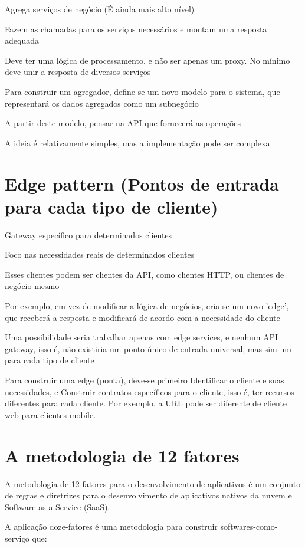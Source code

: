 Agrega serviços de negócio (É ainda mais alto nível)

Fazem as chamadas para os serviços necessários e montam uma resposta adequada

Deve ter uma lógica de processamento, e não ser apenas um proxy. No mínimo deve unir a resposta de diversos serviços

Para construir um agregador, define-se um novo modelo para o sistema, que representará os dados agregados como um subnegócio

A partir deste modelo, pensar na API que fornecerá as operações

A ideia é relativamente simples, mas a implementação pode ser complexa

\section{Edge pattern (Pontos de entrada para cada tipo de cliente)}
Gateway específico para determinados clientes

Foco nas necessidades reais de determinados clientes

Esses clientes podem ser clientes da API, como clientes HTTP, ou clientes de negócio mesmo

Por exemplo, em vez de modificar a lógica de negócios, cria-se um novo 'edge', que receberá a resposta e modificará de acordo com a necessidade do cliente

Uma possibilidade seria trabalhar apenas com edge services, e nenhum API gateway, isso é, não existiria um ponto único de entrada universal, mas sim um para cada tipo de cliente

Para construir uma edge (ponta), deve-se primeiro Identificar o cliente e suas necessidades, e Construir contratos específicos para o cliente, isso é, ter recursos diferentes para cada cliente. Por exemplo, a URL pode ser diferente de cliente web para clientes mobile.

\section{A metodologia de 12 fatores}

A metodologia de 12 fatores para o desenvolvimento de aplicativos é um conjunto de regras e diretrizes para o desenvolvimento de aplicativos nativos da nuvem e Software as a Service (SaaS). \cite{oracle_microservices}

A aplicação doze-fatores é uma metodologia para construir softwares-como-serviço que:

